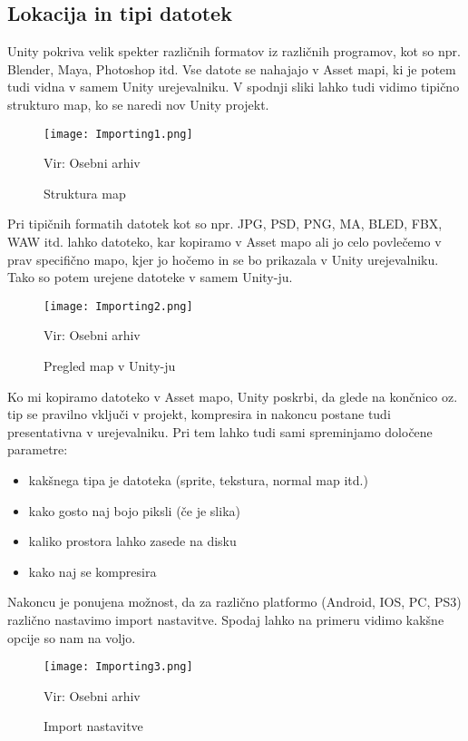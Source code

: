 {\color{indiagreen}\subsection{Lokacija in tipi datotek}}
Unity pokriva velik spekter različnih formatov iz različnih programov, kot so npr. Blender, Maya, Photoshop itd. Vse datote se nahajajo v Asset mapi, ki je potem tudi vidna v samem Unity urejevalniku. V spodnji sliki lahko tudi vidimo tipično strukturo map, ko se naredi nov Unity projekt.\\
\begin{figure}[ht!]
	\centering
	\texttt{[image: Importing1.png]}
	\caption{Struktura map}
	{\tiny Vir: Osebni arhiv}
\end{figure}
Pri tipičnih formatih datotek kot so npr. JPG, PSD, PNG, MA, BLED, FBX, WAW itd. lahko datoteko, kar kopiramo v Asset mapo ali jo celo povlečemo v prav specifično mapo, kjer jo hočemo in se bo prikazala v Unity urejevalniku. Tako so potem urejene datoteke v samem Unity-ju.\\
\begin{figure}[ht!]
	\centering
	\texttt{[image: Importing2.png]}
	\caption{Pregled map v Unity-ju}
	{\tiny Vir: Osebni arhiv}
\end{figure}
Ko mi kopiramo datoteko v Asset mapo, Unity poskrbi, da glede na končnico oz. tip se pravilno vključi v projekt, kompresira in nakoncu postane tudi presentativna v urejevalniku. Pri tem lahko tudi sami spreminjamo določene parametre:
\begin{itemize}
	\item kakšnega tipa je datoteka (sprite, tekstura, normal map itd.)
	\item kako gosto naj bojo piksli (če je slika)
	\item kaliko prostora lahko zasede na disku
	\item kako naj se kompresira
\end{itemize}
Nakoncu je ponujena možnost, da za različno platformo (Android, IOS, PC, PS3) različno nastavimo import nastavitve. Spodaj lahko na primeru vidimo kakšne opcije so nam na voljo.
\begin{figure}[ht!]
	\centering
	\texttt{[image: Importing3.png]}
	\caption{Import nastavitve}
	{\tiny Vir: Osebni arhiv}
\end{figure}